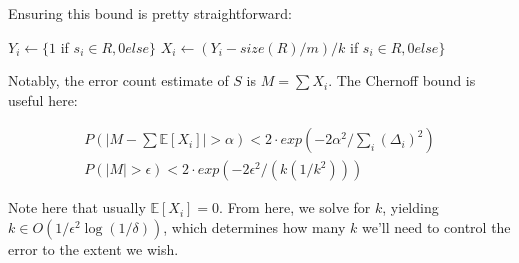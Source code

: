 \documentclass[fleqn]{article}
\begin{document}
Ensuring this bound is pretty straightforward:

\begin{algorithmic}
\STATE $Y_i \gets \{1 $ if $s_i \in R, 0 else\}$
\STATE $X_i \gets (Y_i - size(R) / m) / k$ if $s_i \in R, 0 else\}$
\ENDFOR
\end{algorithmic}

Notably, the error count estimate of $S$ is $M = \sum X_i$. The Chernoff bound is useful here:

\begin{eqnarray}
P(|M - \sum \mathbb{E}[X_i] | > \alpha) < 2 \cdot exp(-2 \alpha^2 / \sum_i (\Delta_i)^2) \\
P(|M| > \epsilon) < 2 \cdot exp(-2 \epsilon^2 / (k (1/k^2)))
\end{eqnarray}

Note here that usually $\mathbb{E}[X_i] = 0$. From here, we solve for $k$, yielding $k \in O(1/\epsilon^2 \log (1/\delta))$, which determines how many $k$ we'll need to control the error to the extent we wish.
\end{document}
